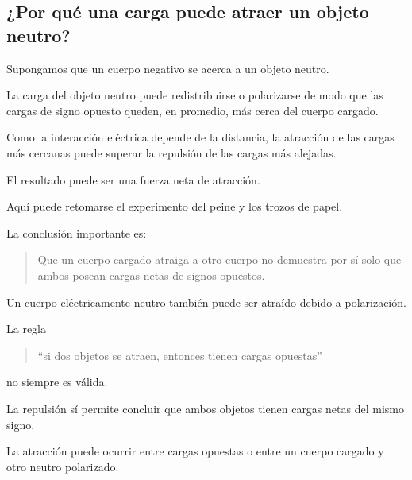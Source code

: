 
\subsection{¿Por qué una carga puede atraer un objeto neutro?}

Supongamos que un cuerpo negativo se acerca a un objeto neutro.

La carga del objeto neutro puede redistribuirse o polarizarse de modo que las
cargas de signo opuesto queden, en promedio, más cerca del cuerpo cargado.

Como la interacción eléctrica depende de la distancia, la atracción de las
cargas más cercanas puede superar la repulsión de las cargas más alejadas.

El resultado puede ser una fuerza neta de atracción.

\begin{notapedagogica}
Aquí puede retomarse el experimento del peine y los trozos de papel.

La conclusión importante es:

\begin{quote}
Que un cuerpo cargado atraiga a otro cuerpo no demuestra por sí solo que
ambos posean cargas netas de signos opuestos.
\end{quote}

Un cuerpo eléctricamente neutro también puede ser atraído debido a
polarización.
\end{notapedagogica}

\begin{errorfrecuente}
La regla

\begin{quote}
``si dos objetos se atraen, entonces tienen cargas opuestas''
\end{quote}

no siempre es válida.

La repulsión sí permite concluir que ambos objetos tienen cargas netas del
mismo signo.

La atracción puede ocurrir entre cargas opuestas o entre un cuerpo cargado
y otro neutro polarizado.
\end{errorfrecuente}



